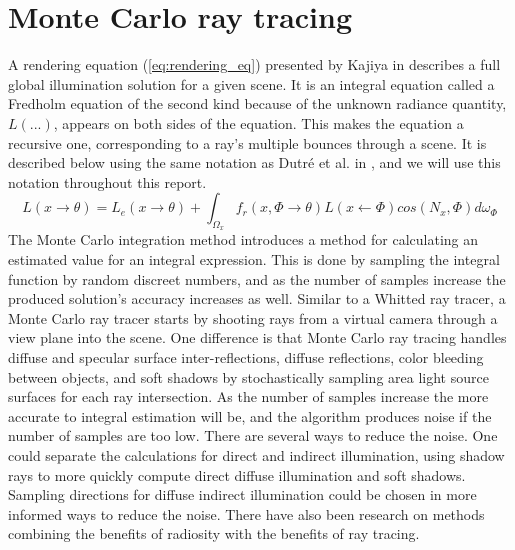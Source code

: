 \documentclass[]{report}   %
\begin{document}
\section{Monte Carlo ray tracing}
A rendering equation (\ref{eq:rendering_eq}) presented by Kajiya in \cite{kajiya} describes a full global illumination solution for a given scene. It is an integral equation called a Fredholm equation of the second kind because of the unknown radiance quantity, $L(...)$, appears on both sides of the equation. This makes the equation a recursive one, corresponding to a ray's multiple bounces through a scene. It is described below using the same notation as Dutr\'{e} et al. in \cite{dutre}, and we will use this notation throughout this report.
\begin{equation}
\label{eq:rendering_eq}
L(x \rightarrow \theta) = L_e(x \rightarrow \theta) + \int_{\Omega_x} f_r(x, \Phi \rightarrow \theta)L(x \leftarrow \Phi)cos(N_x, \Phi)d\omega_{\Phi}
\end{equation}
The Monte Carlo integration method introduces a method for calculating an estimated value for an integral expression. This is done by sampling the integral function by random discreet numbers, and as the number of samples increase the produced solution's accuracy increases as well. Similar to a Whitted ray tracer, a Monte Carlo ray tracer starts by shooting rays from a virtual camera through a view plane into the scene. One difference is that Monte Carlo ray tracing handles diffuse and specular surface inter-reflections, diffuse reflections, color bleeding between objects, and soft shadows by stochastically sampling area light source surfaces for each ray intersection. As the number of samples increase the more accurate to integral estimation will be, and the algorithm produces noise if the number of samples are too low. There are several ways to reduce the noise. One could separate the calculations for direct and indirect illumination, using shadow rays to more quickly compute direct diffuse illumination and soft shadows. Sampling directions for diffuse indirect illumination could be chosen in more informed ways to reduce the noise. There have also been research on methods combining the benefits of radiosity with the benefits of ray tracing.
\end{document}
